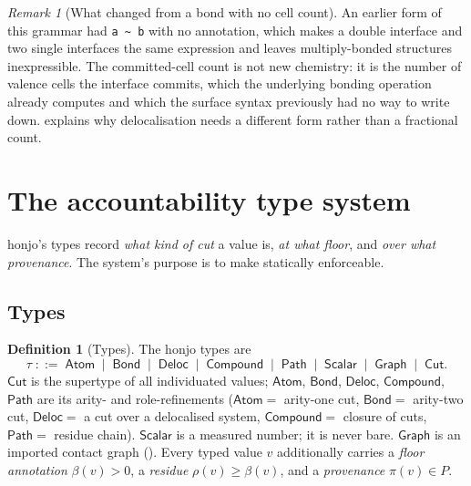 \documentclass[11pt,twocolumn,a4paper]{article}
\theoremstyle{thmstyle}
\theoremstyle{definition}
\newtheorem{definition}[theorem]{Definition}
\theoremstyle{remark}
\newtheorem{remark}[theorem]{Remark}
\newcommand{\flo}{\beta}
\newcommand{\res}{\rho}
\newcommand{\bnf}{\;::=\;}
\newcommand{\alt}{\;\mid\;}
\newcommand{\hj}[1]{\texttt{#1}}
\newcommand{\Prov}{\pi}
\begin{document}
\begin{remark}[What changed from a bond with no cell count]
\label{rem:why-cells}
An earlier form of this grammar had \hj{a \~{} b} with no annotation,
which makes a double interface and two single interfaces the same
expression and leaves multiply-bonded structures inexpressible. The
committed-cell count is not new chemistry: it is the number of valence
cells the interface commits, which the underlying bonding operation
already computes and which the surface syntax previously had no way to
write down.  explains why delocalisation needs a
different form rather than a fractional count.
\end{remark}

\section{The accountability type system}
\label{sec:types}

honjo's types record \emph{what kind of cut} a value is, \emph{at what
floor}, and \emph{over what provenance}. The system's purpose is to make
 statically enforceable.

\subsection{Types}

\begin{definition}[Types]
\label{def:types}
The honjo types are
\[
\tau \bnf \mathsf{Atom} \alt \mathsf{Bond} \alt \mathsf{Deloc}
   \alt \mathsf{Compound} \alt \mathsf{Path} \alt \mathsf{Scalar}
   \alt \mathsf{Graph} \alt \mathsf{Cut}.
\]
$\mathsf{Cut}$ is the supertype of all individuated values;
$\mathsf{Atom}$, $\mathsf{Bond}$, $\mathsf{Deloc}$, $\mathsf{Compound}$,
$\mathsf{Path}$ are its arity- and role-refinements ($\mathsf{Atom}=$
arity-one cut, $\mathsf{Bond}=$ arity-two cut, $\mathsf{Deloc}=$ a cut
over a delocalised system, $\mathsf{Compound}=$ closure of cuts,
$\mathsf{Path}=$ residue chain). $\mathsf{Scalar}$ is a measured number;
it is never bare. $\mathsf{Graph}$ is an imported contact graph
(). Every typed value $v$ additionally carries a
\emph{floor annotation} $\flo(v)>0$, a \emph{residue} $\res(v)\ge\flo(v)$,
and a \emph{provenance} $\Prov(v)\in P$.
\end{definition}
\end{document}
